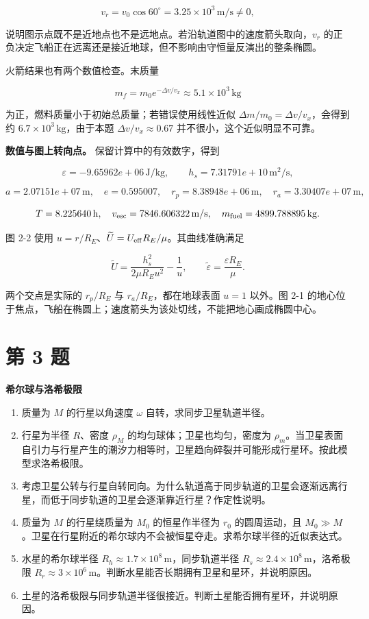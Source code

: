 \documentclass[12pt,a4paper,UTF8]{ctexart}
\newcommand{\tightlist}{\setlength{\itemsep}{0pt}\setlength{\parskip}{0pt}}
\begin{document}
\[v_r=v_0\cos60^\circ=3.25\times10^3\,\mathrm{m/s}\ne0,\]

说明图示点既不是近地点也不是远地点。若沿轨道图中的速度箭头取向，\(v_r\)
的正负决定飞船正在远离还是接近地球，但不影响由守恒量反演出的整条椭圆。

火箭结果也有两个数值检查。末质量

\[m_f=m_0e^{-\Delta v/v_x}\approx5.1\times10^3\,\mathrm{kg}\]

为正，燃料质量小于初始总质量；若错误使用线性近似
\(\Delta m/m_0=\Delta v/v_x\)，会得到约
\(6.7\times10^3\,\mathrm{kg}\)，由于本题 \(\Delta v/v_x\approx0.67\)
并不很小，这个近似明显不可靠。

\textbf{数值与图上转向点。} 保留计算中的有效数字，得到

\[\varepsilon=-9.65962e+06\,\mathrm{J/kg},\qquad h_s=7.31791e+10\,\mathrm{m^2/s},\]

\[a=2.07151e+07\,\mathrm m,\quad e=0.595007,\quad r_p=8.38948e+06\,\mathrm m,\quad r_a=3.30407e+07\,\mathrm m,\]

\[T=8.225640\,\mathrm h,\quad v_{\rm esc}=7846.606322\,\mathrm{m/s},\quad m_{\rm fuel}=4899.788895\,\mathrm{kg}.\]

图 2-2 使用
\(u=r/R_E\)、\(\widetilde U=U_{\rm eff}R_E/\mu\)。其曲线准确满足

\[\widetilde U=\frac{h_s^2}{2\mu R_Eu^2}-\frac1u,\qquad\widetilde\varepsilon=\frac{\varepsilon R_E}\mu.\]

两个交点是实际的 \(r_p/R_E\) 与 \(r_a/R_E\)，都在地球表面 \(u=1\)
以外。图 2-1
的地心位于焦点，飞船在椭圆上；速度箭头为该处切线，不能把地心画成椭圆中心。

\newpage

\section{第 3 题}\label{ux7b2c-3-ux9898}

\textbf{希尔球与洛希极限}

\begin{enumerate}
\def\labelenumi{\arabic{enumi}.}
\tightlist
\item
  质量为 \(M\) 的行星以角速度 \(\omega\) 自转，求同步卫星轨道半径。
\item
  行星为半径 \(R\)、密度 \(\rho_M\) 的均匀球体；卫星也均匀，密度为
  \(\rho_m\)。当卫星表面自引力与行星产生的潮汐力相等时，卫星趋向碎裂并可能形成行星环。按此模型求洛希极限。
\item
  考虑卫星公转与行星自转同向。为什么轨道高于同步轨道的卫星会逐渐远离行星，而低于同步轨道的卫星会逐渐靠近行星？作定性说明。
\item
  质量为 \(M\) 的行星绕质量为 \(M_0\) 的恒星作半径为 \(r_0\)
  的圆周运动，且
  \(M_0\gg M\)。卫星在行星附近的希尔球内不会被恒星夺走。求希尔球半径的近似表达式。
\item
  水星的希尔球半径 \(R_h\approx1.7\times10^8\,\mathrm m\)，同步轨道半径
  \(R_s\approx2.4\times10^8\,\mathrm m\)，洛希极限
  \(R_r\approx3\times10^6\,\mathrm m\)。判断水星能否长期拥有卫星和星环，并说明原因。
\item
  土星的洛希极限与同步轨道半径很接近。判断土星能否拥有星环，并说明原因。
\end{enumerate}
\end{document}
